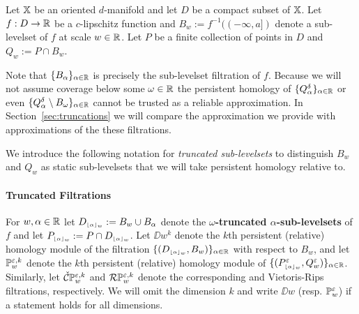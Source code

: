 
Let $\mathbb{X}$ be an oriented $d$-manifold and let $D$ be a compact subset of $\mathbb{X}$.
Let $f: D\to\mathbb{R}$ be a $c$-lipschitz function and $B_w := f^{-1}((-\infty,a])$ denote a sub-levelset of $f$ at scale $w\in\mathbb{R}$.
Let $P$ be a finite collection of points in $D$ and $Q_w := P\cap B_w$.

Note that $\{B_\alpha\}_{\alpha\in\mathbb{R}}$ is precisely the sub-levelset filtration of $f$.
Because we will not assume coverage below some $\omega\in\mathbb{R}$ the persistent homology of $\{Q_\alpha^\delta\}_{\alpha\in\mathbb{R}}$ or even $\{Q_\alpha^\delta\setminus B_\omega\}_{\alpha\in\mathbb{R}}$ cannot be trusted as a reliable approximation.
In Section~\ref{sec:truncations} we will compare the approximation we provide with approximations of the these filtrations.

We introduce the following notation for \emph{truncated sub-levelsets} to distinguish $B_w$ and $Q_w$ as static sub-levelsets that we will take persistent homology relative to.

\paragraph{Truncated Filtrations}

For $w,\alpha\in\mathbb{R}$ let $D_{\scriptscriptstyle \lfloor\alpha\rfloor_{w}} := B_w\cup B_\alpha$ denote the \textbf{$\omega$-truncated $\alpha$-sub-levelsets} of $f$ and let $P_{\scriptscriptstyle \lfloor\alpha\rfloor_{w}} := P\cap D_{\scriptscriptstyle \lfloor\alpha\rfloor_{w}}$.
%
Let $\DD{w}^k$ denote the $k$th persistent (relative) homology module of the filtration $\{(D_{\scriptscriptstyle \lfloor\alpha\rfloor_{w}},B_w)\}_{\alpha\in\mathbb{R}}$ with respect to $B_w$, and let $\mathbb{P}_{w}^{\varepsilon,k}$
denote the $k$th persistent (relative) homology module of $\{(P_{\scriptscriptstyle \lfloor\alpha\rfloor_{w}}^\varepsilon,Q_w^\varepsilon)\}_{\alpha\in\mathbb{R}}$.
Similarly, let $\check{\mathcal{C}}\mathbb{P}_{w}^{\varepsilon,k}$ and $\mathcal{R}\mathbb{P}_{w}^{\varepsilon,k}$ denote the corresponding \Cech and Vietoris-Rips filtrations, respectively.
We will omit the dimension $k$ and write $\DD{w}$ (resp. $\mathbb{P}_{w}^{\varepsilon}$) if a statement holds for all dimensions.

